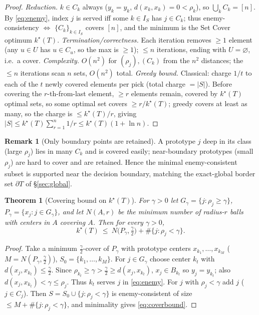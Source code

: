 \documentclass{amsart}
\newtheorem{theorem}{Theorem}
\theoremstyle{definition}
\newtheorem{remark}{Remark}
\begin{document}
\begin{proof}
\emph{Reduction.} $k\in C_k$ always ($y_k=y_k$, $d(x_k,x_k)=0<\rho_k$), so
$\bigcup_kC_k=[n]$. By \eqref{eq:enemy}, index $j$ is served iff some $k\in I_S$
has $j\in C_k$; thus enemy-consistency $\iff$ $\{C_k\}_{k\in I_S}$ covers $[n]$,
and the minimum is the Set Cover optimum $k^\star(T)$.
\emph{Termination/correctness.} Each iteration removes $\ge1$ element (any $u\in
U$ has $u\in C_u$, so the max is $\ge1$); $\le n$ iterations, ending with
$U=\varnothing$, i.e.\ a cover.
\emph{Complexity.} $O(n^2)$ for $(\rho_j),(C_k)$ from the $n^2$ distances; the
$\le n$ iterations scan $n$ sets, $O(n^2)$ total.
\emph{Greedy bound.} Classical: charge $1/t$ to each of the $t$ newly covered
elements per pick (total charge $=|S|$). Before covering the $r$-th-from-last
element, $\ge r$ elements remain, covered by $k^\star(T)$ optimal sets, so some
optimal set covers $\ge r/k^\star(T)$; greedy covers at least as many, so the
charge is $\le k^\star(T)/r$, giving $|S|\le k^\star(T)\sum_{r=1}^n1/r\le
k^\star(T)(1+\ln n)$.
\end{proof}

\begin{remark}[Only boundary points are retained]\label{rem:boundary}
A prototype $j$ deep in its class (large $\rho_j$) lies in many $C_k$ and is
covered easily; near-boundary prototypes (small $\rho_j$) are hard to cover and
are retained. Hence the minimal enemy-consistent subset is supported near the
decision boundary, matching the exact-global border set $\partial T$ of
\S\ref{sec:global}.
\end{remark}

\begin{theorem}[Covering bound on $k^\star(T)$]\label{thm:cover}
For $\gamma>0$ let $G_\gamma=\{j:\rho_j\ge\gamma\}$, $P_\gamma=\{x_j:j\in
G_\gamma\}$, and let $N(A,r)$ be the minimum number of radius-$r$ balls with
centers in $A$ covering $A$. Then for every $\gamma>0$,
\begin{equation}\label{eq:coverbound}
k^\star(T)\ \le\ N\!\big(P_\gamma,\tfrac\gamma2\big)+\#\{j:\rho_j<\gamma\}.
\end{equation}
\end{theorem}

\begin{proof}
Take a minimum $\tfrac\gamma2$-cover of $P_\gamma$ with prototype centers
$x_{k_1},\dots,x_{k_M}$ ($M=N(P_\gamma,\tfrac\gamma2)$), $S_0=\{k_1,\dots,k_M\}$.
For $j\in G_\gamma$ choose center $k_t$ with $d(x_j,x_{k_t})\le\tfrac\gamma2$.
Since $\rho_{k_t}\ge\gamma>\tfrac\gamma2\ge d(x_j,x_{k_t})$, $x_j\in B_{k_t}$ so
$y_j=y_{k_t}$; also $d(x_j,x_{k_t})<\gamma\le\rho_j$. Thus $k_t$ serves $j$ in
\eqref{eq:enemy}. For $j$ with $\rho_j<\gamma$ add $j$ ($j\in C_j$). Then
$S=S_0\cup\{j:\rho_j<\gamma\}$ is enemy-consistent of size $\le
M+\#\{j:\rho_j<\gamma\}$, and minimality gives \eqref{eq:coverbound}.
\end{proof}
\end{document}
